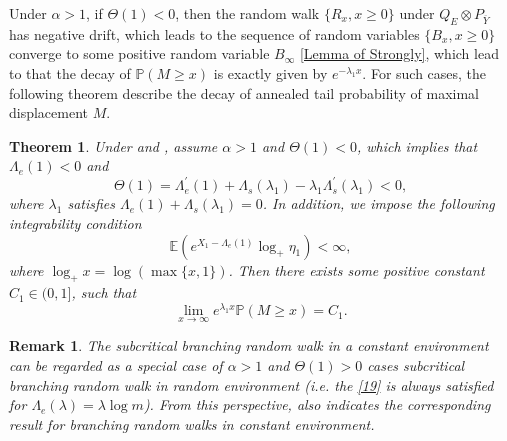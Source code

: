 \documentclass[]{article}
\numberwithin{equation}{section}
\theoremstyle{thmstyleone}%
\newtheorem{theorem}{Theorem}%
\theoremstyle{thmstyletwo}%
\newtheorem{remark}{Remark}%
\theoremstyle{thmstylethree}%
\theoremstyle{thmstylefour}%
\theoremstyle{thmstylefive}%
\theoremstyle{thmstylesix}%
\newcommand{\E}{\mathbb{E}}
\renewcommand{\P}{\mathbb{P}}
\begin{document}
	Under $\alpha>1$, if $\varTheta(1)<0$, then the random walk $\{R_x,x\geqslant0\}$ under $Q_E\otimes P_{\overline{Y}}$ has negative drift, which leads to the sequence of random variables $\{B_x,x\geqslant0\}$ converge to some positive random variable $B_\infty$ \cref{Lemma of Strongly}, which lead to that the decay of $\P(M\geqslant x)$ is exactly given by $e^{-\lambda_1x}$.
	For such cases, the following theorem describe the decay of annealed tail probability of maximal displacement $M$.
	\begin{theorem}\label{Theorem of strongly cases}
		Under  and , assume $\alpha>1$ and $\varTheta(1)<0$, which implies that $\Lambda_e(1)<0$ and 
		\begin{equation}\label{19}
			\varTheta(1) = \Lambda_e^\prime(1)+\Lambda_s(\lambda_1)-\lambda_1\Lambda_s^\prime(\lambda_1) <0,
		\end{equation}
		where $\lambda_1$ satisfies $ \Lambda_e(1)+\Lambda_s(\lambda_1) =0 $.
		In addition, we impose the following integrability condition
		\begin{equation}\label{addition assumption for strongly cases}
			\E\left( e^{X_1-\Lambda_e(1)} \log_+ \eta_1\right)<\infty,
		\end{equation}
		where $\log_+ x = \log (\max\{x,1\})$.
		Then there exists some positive constant $C_1 \in (0,1]$, such that
		\begin{equation}
			\lim\limits_{x\rightarrow\infty}e^{\lambda_1 x }\P(M\geqslant x ) = C_1.
		\end{equation}
	\end{theorem}
	
	\begin{remark}
		The subcritical branching random walk in a constant environment can be regarded as a special case of $\alpha>1$ and $\varTheta(1)>0$ cases subcritical branching random walk in random environment (i.e. the \cref{19} is always satisfied for $\Lambda_e(\lambda)=\lambda \log m$).
		From this perspective,  also indicates the corresponding result for branching random walks in constant environment.
	\end{remark}
	
\end{document}

